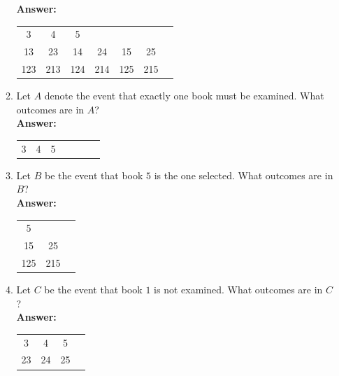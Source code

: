 \documentclass[12pt]{article}
\theoremstyle{homework}
\begin{document}
\begin{enumerate}
\begin{enumerate}
 \textbf{Answer:}
 \begin{center}
  \begin{tabular}{c c c c c c c}
  3 & 4 & 5 &  &  &  \\
  13 & 23 & 14 & 24 & 15 & 25\\
  123 & 213 & 124 & 214 & 125 & 215 
  \end{tabular}
\end{center}
\vspace{.5in}
 
\item Let $A$ denote the event that exactly one book must be examined. What outcomes are in $A$?\\

\textbf{Answer:}
\begin{center}
 \begin{tabular}{c c c c c c c}
 3 & 4 & 5 &  &  &  
 \end{tabular}
\end{center}
\vspace{.5in}

\item Let $B$ be the event that book $5$ is the one selected. What outcomes are in $B$?\\
\textbf{Answer:}
\begin{center}
 \begin{tabular}{c c c }
  5 &  \\
  15 & 25\\
  125 & 215 
 \end{tabular}
\end{center}
\vspace{.5in}


\item Let $C$ be the event that book $1$ is not examined. What outcomes are in $C$?\\
\textbf{Answer:}
\begin{center}
 \begin{tabular}{c c c c}
 3 & 4 & 5 \\
 23 & 24 & 25
 \end{tabular}
\end{center}


\end{enumerate}
\vspace{1in}


\end{enumerate}
\end{document}
